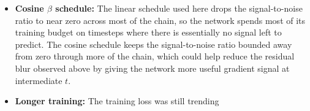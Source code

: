 \documentclass{article}
\begin{document}
\begin{itemize}
  \item \textbf{Cosine $\beta$ schedule:} The linear schedule used here drops
    the signal-to-noise ratio to near zero across most of the chain, so the
    network spends most of its training budget on timesteps where there is
    essentially no signal left to predict. The cosine schedule keeps the signal-to-noise ratio bounded away from zero through more of
    the chain, which could help reduce the residual blur observed
    above by giving the network more useful gradient signal at
    intermediate $t$.
  \item \textbf{Longer training:} The training loss was still trending

\end{itemize}
\end{document}

